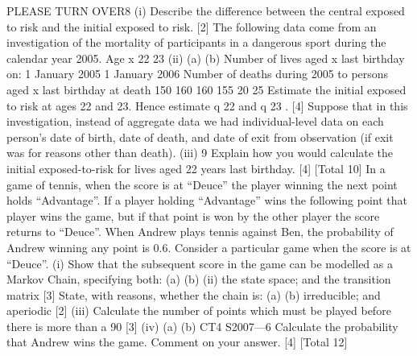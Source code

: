 \documentclass[a4paper,12pt]{article}
\begin{document}
\begin{enumerate}
PLEASE TURN OVER8
(i)
Describe the difference between the central exposed to risk and the initial
exposed to risk.
[2]
The following data come from an investigation of the mortality of participants in a
dangerous sport during the calendar year 2005.
Age x
22
23
(ii)
(a)
(b)
Number of lives aged x last
birthday on:
1 January 2005 1 January 2006 Number of deaths
during 2005 to
persons aged x last
birthday at death
150
160 160
155 20
25
Estimate the initial exposed to risk at ages 22 and 23.
Hence estimate q 22 and q 23 .
[4]
Suppose that in this investigation, instead of aggregate data we had individual-level
data on each person’s date of birth, date of death, and date of exit from observation (if
exit was for reasons other than death).
(iii)
9
Explain how you would calculate the initial exposed-to-risk for lives aged 22
years last birthday.
[4]
[Total 10]
In a game of tennis, when the score is at “Deuce” the player winning the next point
holds “Advantage”. If a player holding “Advantage” wins the following point that
player wins the game, but if that point is won by the other player the score returns to
“Deuce”.
When Andrew plays tennis against Ben, the probability of Andrew winning any point
is 0.6. Consider a particular game when the score is at “Deuce”.
(i)
Show that the subsequent score in the game can be modelled as a Markov
Chain, specifying both:
(a)
(b)
(ii)
the state space; and
the transition matrix
[3]
State, with reasons, whether the chain is:
(a)
(b)
irreducible; and
aperiodic
[2]
(iii) Calculate the number of points which must be played before there is more than
a 90%
[3]
(iv) (a)
(b)
CT4 S2007—6
Calculate the probability that Andrew wins the game.
Comment on your answer.
[4]
[Total 12]


\end{enumerate}
\end{document}
